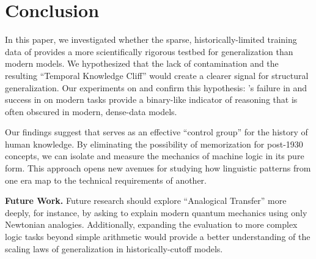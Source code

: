 \section{Conclusion}
\label{sec:conclusion}

In this paper, we investigated whether the sparse, historically-limited training data of \talkie provides a more scientifically rigorous testbed for generalization than modern models. We hypothesized that the lack of contamination and the resulting ``Temporal Knowledge Cliff'' would create a clearer signal for structural generalization. Our experiments on \humaneval and \mmlu confirm this hypothesis: \talkie's failure in \zeroshot and success in \fewshot on modern tasks provide a binary-like indicator of reasoning that is often obscured in modern, dense-data models.

Our findings suggest that \talkie serves as an effective ``control group'' for the history of human knowledge. By eliminating the possibility of memorization for post-1930 concepts, we can isolate and measure the mechanics of machine logic in its pure form. This approach opens new avenues for studying how linguistic patterns from one era map to the technical requirements of another.

{\bf Future Work.} Future research should explore ``Analogical Transfer'' more deeply, for instance, by asking \talkie to explain modern quantum mechanics using only Newtonian analogies. Additionally, expanding the evaluation to more complex logic tasks beyond simple arithmetic would provide a better understanding of the scaling laws of generalization in historically-cutoff models.
\clearpage
